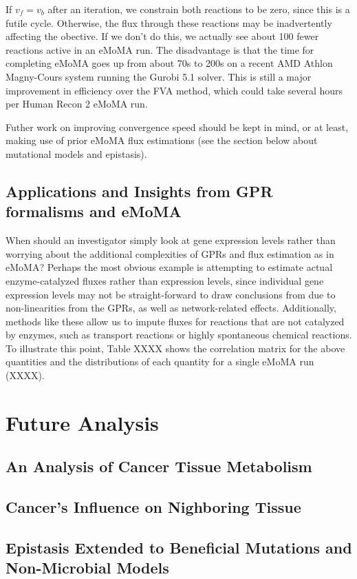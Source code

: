 \documentclass[phd,tocprelim]{cornell}
\begin{document}
If $v_f = v_b$ after an iteration, we constrain both reactions to be zero, since this
is a futile cycle. Otherwise, the flux through these reactions may be inadvertently affecting
the obective. If we don't do this, we actually see about 100 fewer reactions active in an eMoMA run.
The disadvantage is that the time for completing eMoMA goes up from about 70s to 200s on a recent
AMD Athlon Magny-Cours system running the Gurobi 5.1 solver. This is still a major improvement 
in efficiency over the FVA method, which could take several hours per Human Recon 2 eMoMA run.

Futher work on improving convergence speed should be kept in mind, or at least, making use of prior
eMoMA flux estimations (see the section below about mutational models and epistasis).

\subsection{Applications and Insights from GPR formalisms and eMoMA}
When should an investigator simply look at gene expression levels rather than
worrying about the additional complexities of GPRs and flux estimation as in eMoMA?
Perhaps the most obvious example is attempting to estimate actual enzyme-catalyzed 
fluxes rather than expression levels, since individual gene expression levels
may not be straight-forward to draw conclusions from due to non-linearities
from the GPRs, as well as network-related effects. Additionally, methods like these
allow us to impute fluxes for reactions that are not catalyzed by enzymes,
such as transport reactions or highly spontaneous chemical reactions. To illustrate
this point, Table XXXX shows the correlation matrix for the above quantities and 
the distributions of each quantity for a single eMoMA run (XXXX).


\section{Future Analysis}
\subsection{An Analysis of Cancer Tissue Metabolism}
\subsection{Cancer's Influence on Nighboring Tissue}
\subsection{Epistasis Extended to Beneficial Mutations and Non-Microbial Models}
\end{document}
